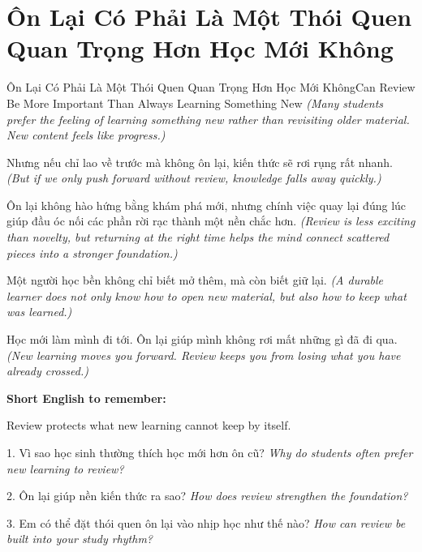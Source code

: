 \section{Ôn Lại Có Phải Là Một Thói Quen Quan Trọng Hơn Học Mới Không}
\begin{truyen}{Ôn Lại Có Phải Là Một Thói Quen Quan Trọng Hơn Học Mới Không}{Can Review Be More Important Than Always Learning Something New}
\textit{(Many students prefer the feeling of learning something new rather than revisiting older material. New content feels like progress.)}

Nhưng nếu chỉ lao về trước mà không ôn lại, kiến thức sẽ rơi rụng rất nhanh.
\textit{(But if we only push forward without review, knowledge falls away quickly.)}

Ôn lại không hào hứng bằng khám phá mới, nhưng chính việc quay lại đúng lúc giúp đầu óc nối các phần rời rạc thành một nền chắc hơn.
\textit{(Review is less exciting than novelty, but returning at the right time helps the mind connect scattered pieces into a stronger foundation.)}

Một người học bền không chỉ biết mở thêm, mà còn biết giữ lại.
\textit{(A durable learner does not only know how to open new material, but also how to keep what was learned.)}
\end{truyen}

\begin{baihoc}
Học mới làm mình đi tới. Ôn lại giúp mình không rơi mất những gì đã đi qua.
\textit{(New learning moves you forward. Review keeps you from losing what you have already crossed.)}
\end{baihoc}

\begin{ghinhoanh}
\textbf{Short English to remember:}

Review protects what new learning cannot keep by itself.

\end{ghinhoanh}

\begin{tuhocnhanh}
1. Vì sao học sinh thường thích học mới hơn ôn cũ? \textit{Why do students often prefer new learning to review?}

2. Ôn lại giúp nền kiến thức ra sao? \textit{How does review strengthen the foundation?}

3. Em có thể đặt thói quen ôn lại vào nhịp học như thế nào? \textit{How can review be built into your study rhythm?}
\end{tuhocnhanh}
\ngancach
